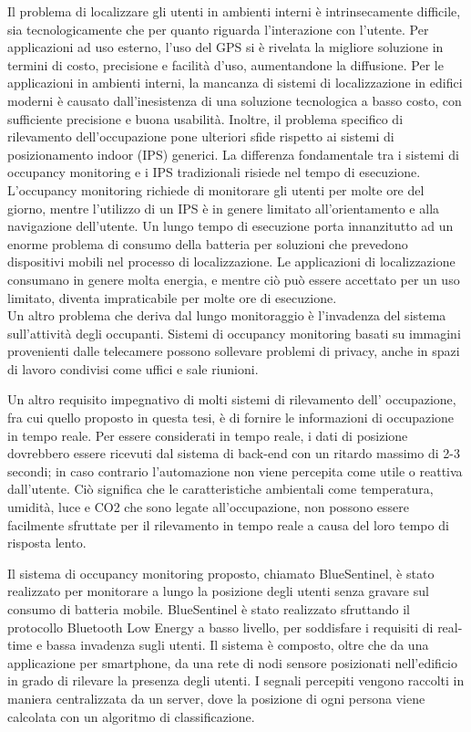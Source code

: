 Il problema di localizzare gli utenti in ambienti interni è intrinsecamente difficile, sia tecnologicamente che per quanto riguarda l'interazione con l'utente. Per applicazioni ad uso esterno, l'uso del GPS si è rivelata la migliore soluzione in termini di costo, precisione e facilità d'uso, aumentandone la diffusione. Per le applicazioni in ambienti interni, la mancanza di sistemi di localizzazione in edifici moderni è causato dall'inesistenza di una soluzione tecnologica a basso costo, con sufficiente precisione e buona usabilità. Inoltre, il problema specifico di rilevamento dell'occupazione pone ulteriori sfide rispetto ai sistemi di posizionamento indoor (IPS) generici. La differenza fondamentale tra i sistemi di occupancy monitoring e i IPS tradizionali risiede nel tempo di esecuzione. L'occupancy monitoring richiede di monitorare gli utenti per molte ore del giorno, mentre l'utilizzo di un IPS è in genere limitato all'orientamento e alla navigazione dell'utente.
Un lungo tempo di esecuzione porta innanzitutto ad un enorme problema di consumo della batteria per soluzioni che prevedono dispositivi mobili nel processo di localizzazione. Le applicazioni di localizzazione consumano in genere molta energia, e mentre ciò può essere accettato per un uso limitato, diventa impraticabile per molte ore di esecuzione.\\
Un altro problema che deriva dal lungo monitoraggio è l'invadenza del sistema sull'attività degli occupanti. Sistemi di occupancy monitoring basati su immagini provenienti dalle telecamere possono sollevare problemi di privacy, anche in spazi di lavoro condivisi come uffici e sale riunioni.

Un altro requisito impegnativo di molti sistemi di rilevamento dell' occupazione, fra cui quello proposto in questa tesi, è di fornire le informazioni di occupazione in tempo reale. Per essere considerati in tempo reale, i dati di posizione dovrebbero essere ricevuti dal sistema di back-end con un ritardo massimo di 2-3 secondi; in caso contrario l'automazione non viene percepita come utile o reattiva dall'utente. Ciò significa che le caratteristiche ambientali come temperatura, umidità, luce e CO2 che sono legate all'occupazione, non possono essere facilmente sfruttate per il rilevamento in tempo reale a causa del loro tempo di risposta lento.

Il sistema di occupancy monitoring proposto, chiamato BlueSentinel, è stato realizzato per monitorare a lungo la posizione degli utenti senza gravare sul consumo di batteria mobile. BlueSentinel è stato realizzato sfruttando il protocollo Bluetooth Low Energy a basso livello, per soddisfare i requisiti di real-time e bassa invadenza sugli utenti. Il sistema è composto, oltre che da una applicazione per smartphone, da una rete di nodi sensore posizionati nell'edificio in grado di rilevare la presenza degli utenti. I segnali percepiti vengono raccolti in maniera centralizzata da un server, dove la posizione di ogni persona viene calcolata con un algoritmo di classificazione.

